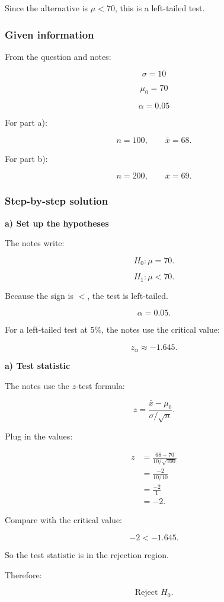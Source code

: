 \documentclass[10pt]{article}
\begin{document}
Since the alternative is \(\mu<70\),
this is a left-tailed test.

\subsubsection*{Given information}
From the question and notes:

\[
\sigma=10
\]

\[
\mu_0=70
\]

\[
\alpha=0.05
\]

For part a):

\[
n=100,
\qquad
\bar{x}=68.
\]

For part b):

\[
n=200,
\qquad
\bar{x}=69.
\]

\subsubsection*{Step-by-step solution}

\textbf{a) Set up the hypotheses}

The notes write:

\[
H_0:\mu=70.
\]

\[
H_1:\mu<70.
\]

Because the sign is \(<\), the test is left-tailed.

\[
\alpha=0.05.
\]

For a left-tailed test at 5\%,
the notes use the critical value:

\[
z_\alpha\approx -1.645.
\]

\textbf{a) Test statistic}

The notes use the \(z\)-test formula:

\[
z=
\frac{\bar{x}-\mu_0}
{\sigma/\sqrt{n}}.
\]

Plug in the values:

\begin{align*}
z
&=
\frac{68-70}
{10/\sqrt{100}} \\[2mm]
&=
\frac{-2}{10/10} \\[2mm]
&=
\frac{-2}{1} \\[2mm]
&=-2.
\end{align*}

Compare with the critical value:

\[
-2<-1.645.
\]

So the test statistic is in the rejection region.

Therefore:

\[
\text{Reject } H_0.
\]
\end{document}
